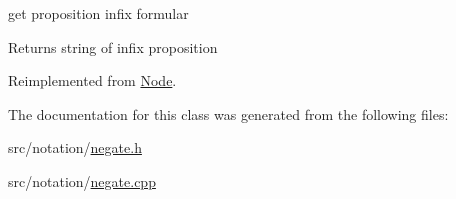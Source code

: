 get proposition infix formular 

\begin{DoxyReturn}{Returns}
string of infix proposition 
\end{DoxyReturn}


Reimplemented from \hyperlink{class_node_a0746502074a232243dcac3b96f3ce2d0}{Node}.



The documentation for this class was generated from the following files\+:\begin{DoxyCompactItemize}
\item 
src/notation/\hyperlink{negate_8h}{negate.\+h}\item 
src/notation/\hyperlink{negate_8cpp}{negate.\+cpp}\end{DoxyCompactItemize}
